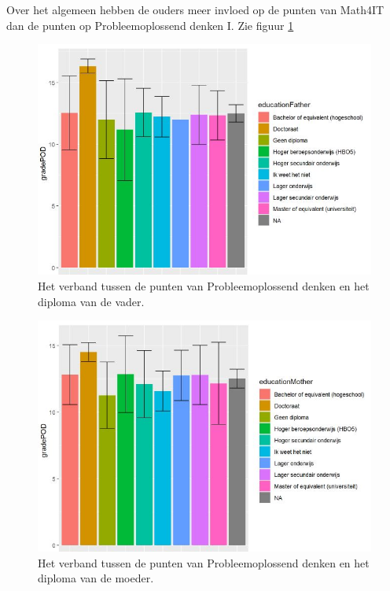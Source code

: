 \documentclass{hogent-article}
\begin{document}
Over het algemeen hebben de ouders meer invloed op de punten van Math4IT dan de punten op Probleemoplossend denken I. Zie figuur \ref{fig:gradePOD-EducationFather}
\begin{figure}[H]
    \includegraphics[width=\linewidth]{gradePOD-EducationFather.JPG}
    \caption{Het verband tussen de punten van Probleemoplossend denken en het diploma van de vader.}
    \label{fig:gradePOD-EducationFather}
\end{figure}
\begin{figure}[h!]
    \includegraphics[width=\linewidth]{gradePOD-EducationMother.JPG}
    \caption{Het verband tussen de punten van Probleemoplossend denken en het diploma van de moeder.}
    \label{fig:gradePOD-EducationMother}
\end{figure}
\end{document}
